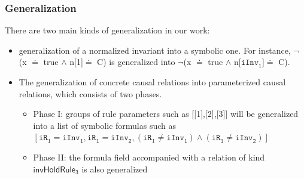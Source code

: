 \documentclass{beamer}
\def \eqc {= }
\def \andc {\wedge }
\def \negc {\neg }
\def \iInv {iInv}
\def \iR {iR}
\begin{document}
\begin{frame}\frametitle{Generalization}
There are two
main kinds of generalization in our work:


\begin{itemize}

 \item generalization of a normalized invariant into a symbolic one.  For instance,  $\negc$(x $\doteq$ true $\andc$ n[1]$\doteq$ C) is generalized into $\negc$(x $\doteq$ true $\andc$ n[$\mathtt{\iInv_1}$]$\doteq$ C).  %

 \item  The generalization of concrete causal relations into parameterized causal relations, which consists of two phases.
  \begin{itemize}
  \item Phase I:  groups of rule parameters  such as [[1],[2],[3]] will be generalized into a list of  symbolic formulas such as $[\mathtt{\iR_1} \eqc \mathtt{\iInv_1},\mathtt{\iR_1} \eqc \mathtt{\iInv_2},  (\mathtt{\iR_1} \ne \mathtt{\iInv_1}) \wedge  (\mathtt{\iR_1} \ne \mathtt{\iInv_2})]$
  \item Phase II: the formula field accompanied with a  relation of kind $\mathsf{invHoldRule_3}$ is also  generalized
 \end{itemize}
\end{itemize}
\end{frame}
\end{document}
